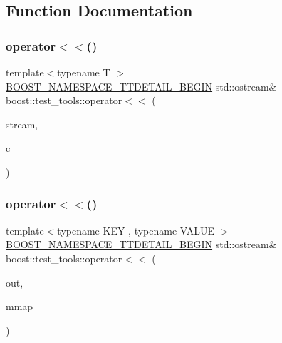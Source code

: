 \subsection{Function Documentation}
\mbox{\label{namespaceboost_1_1test__tools_aac3db192dde409a22c54cba3bd1647bc}} 
\subsubsection{\texorpdfstring{operator$<$$<$()}{operator<<()}\hspace{0.1cm}{\footnotesize\ttfamily [1/4]}}
{\footnotesize\ttfamily template$<$typename T $>$ \\
\mbox{\hyperlink{test__pathshop_8cpp_a808eec32cc0ada550aa63071b535e34d}{B\+O\+O\+S\+T\+\_\+\+N\+A\+M\+E\+S\+P\+A\+C\+E\+\_\+\+T\+T\+D\+E\+T\+A\+I\+L\+\_\+\+B\+E\+G\+IN}} std\+::ostream\& boost\+::test\+\_\+tools\+::operator$<$$<$ (\begin{DoxyParamCaption}\item[{std\+::ostream \&}]{stream,  }\item[{const std\+::list$<$ T $>$ \&}]{c }\end{DoxyParamCaption})}

\mbox{\label{namespaceboost_1_1test__tools_ac18065bfa9f1e322b6c94c8c79b583d5}} 
\subsubsection{\texorpdfstring{operator$<$$<$()}{operator<<()}\hspace{0.1cm}{\footnotesize\ttfamily [2/4]}}
{\footnotesize\ttfamily template$<$typename K\+EY , typename V\+A\+L\+UE $>$ \\
\mbox{\hyperlink{test__pathshop_8cpp_a808eec32cc0ada550aa63071b535e34d}{B\+O\+O\+S\+T\+\_\+\+N\+A\+M\+E\+S\+P\+A\+C\+E\+\_\+\+T\+T\+D\+E\+T\+A\+I\+L\+\_\+\+B\+E\+G\+IN}} std\+::ostream\& boost\+::test\+\_\+tools\+::operator$<$$<$ (\begin{DoxyParamCaption}\item[{ostream \&}]{out,  }\item[{const std\+::map$<$ K\+EY, V\+A\+L\+UE $>$ \&}]{mmap }\end{DoxyParamCaption})}

